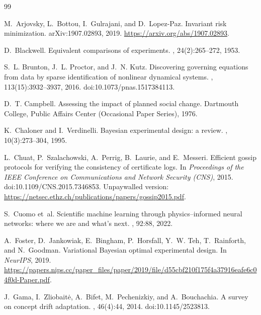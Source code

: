 \documentclass[11pt,a4paper]{article}
\begin{document}
\begin{thebibliography}{99}

M.~Arjovsky, L.~Bottou, I.~Gulrajani, and D.~Lopez-Paz.
\newblock Invariant risk minimization.
\newblock arXiv:1907.02893, 2019.
\newblock \url{https://arxiv.org/abs/1907.02893}.

D.~Blackwell.
\newblock Equivalent comparisons of experiments.
, 24(2):265--272, 1953.

S.~L. Brunton, J.~L. Proctor, and J.~N. Kutz.
\newblock Discovering governing equations from data by sparse identification of nonlinear dynamical systems.
, 113(15):3932--3937, 2016. doi:10.1073/pnas.1517384113.

D.~T. Campbell.
\newblock Assessing the impact of planned social change.
\newblock Dartmouth College, Public Affairs Center (Occasional Paper Series), 1976.

K.~Chaloner and I.~Verdinelli.
\newblock Bayesian experimental design: a review.
, 10(3):273--304, 1995.

L.~Chuat, P.~Szalachowski, A.~Perrig, B.~Laurie, and E.~Messeri.
\newblock Efficient gossip protocols for verifying the consistency of certificate logs.
\newblock In {\em Proceedings of the IEEE Conference on Communications and Network Security (CNS)}, 2015.
\newblock doi:10.1109/CNS.2015.7346853.
\newblock Unpaywalled version: \url{https://netsec.ethz.ch/publications/papers/gossip2015.pdf}. 

S.~Cuomo et~al.
\newblock Scientific machine learning through physics--informed neural networks: where we are and what's next.
, 92:88, 2022.

A.~Foster, D.~Jankowiak, E.~Bingham, P.~Horsfall, Y.~W. Teh, T.~Rainforth, and N.~Goodman.
\newblock Variational Bayesian optimal experimental design.
\newblock In {\em NeurIPS}, 2019.
\newblock \url{https://papers.nips.cc/paper_files/paper/2019/file/d55cbf210f175f4a37916eafe6c04f0d-Paper.pdf}.

J.~Gama, I.~Zliobait{\.e}, A.~Bifet, M.~Pechenizkiy, and A.~Bouchachia.
\newblock A survey on concept drift adaptation.
, 46(4):44, 2014. doi:10.1145/2523813.


\end{thebibliography}
\end{document}
